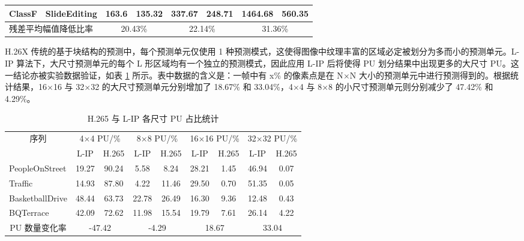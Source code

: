 \begin{table}[hbt]
\begin{tabular}{@{}clcccccc@{}}
        ClassF                                   & SlideEditing                              & 163.6                             & 135.32                            & 337.67                              & 248.71 & 1464.68 & 560.35 \\ \midrule
        \multicolumn{2}{l}{残差平均幅值降低比率} & \multicolumn{2}{c}{20.43\%}               & \multicolumn{2}{c}{22.14\%}       & \multicolumn{2}{c}{31.36\%}                                                                         \\ \bottomrule
    \end{tabular}
\end{table}

H.26X 传统的基于块结构的预测中，每个预测单元仅使用 1 种预测模式，这使得图像中纹理丰富的区域必定被划分为多而小的预测单元。L-IP 算法下，大尺寸预测单元的每个 L 形区域均有一个独立的预测模式，因此应用 L-IP 后将使得 PU 划分结果中出现更多的大尺寸 PU。这一结论亦被实验数据验证，如表 \ref{tab:L-IPPUSize} 所示。表中数据的含义是：一帧中有 x\% 的像素点是在 N$\times$N 大小的预测单元中进行预测得到的。根据统计结果，16$\times$16 与 32$\times$32 的大尺寸预测单元分别增加了 18.67\% 和 33.04\%，4$\times$4 与 8$\times$8 的小尺寸预测单元则分别减少了 47.42\% 和 4.29\%。
\begin{table}[hbt]
    \centering
    \caption{H.265 与 L-IP 各尺寸 PU 占比统计}
    \label{tab:L-IPPUSize}
    \begin{tabular}{@{}lcccccccc@{}}
        \toprule
        \multicolumn{1}{c}{\multirow{2}{*}{序列}} &
        \multicolumn{2}{c}{4$\times$4 PU/\%}      &
        \multicolumn{2}{c}{8$\times$8 PU/\%}      &
        \multicolumn{2}{c}{16$\times$16 PU/\%}    &
        \multicolumn{2}{c}{32$\times$32 PU/\%}                                                                    \\ \cmidrule(l){2-9}
        \multicolumn{1}{c}{}                      & L-IP  & H.265 & L-IP  & H.265 & L-IP  & H.265 & L-IP  & H.265 \\ \midrule
        PeopleOnStreet                            & 19.27 & 90.24 & 5.58  & 8.24  & 28.21 & 1.45  & 46.94 & 0.07  \\
        Traffic                                   & 14.93 & 87.80 & 4.22  & 11.46 & 29.50 & 0.70  & 51.35 & 0.05  \\
        BasketballDrive                           & 48.44 & 63.73 & 22.78 & 26.49 & 16.30 & 9.36  & 12.48 & 0.43  \\
        BQTerrace                                 & 42.09 & 72.62 & 11.98 & 15.54 & 19.79 & 7.61  & 26.14 & 4.22  \\ \midrule
        \multicolumn{1}{c}{PU 数量变化率}         &
        \multicolumn{2}{c}{-47.42}                &
        \multicolumn{2}{c}{-4.29}                 &
        \multicolumn{2}{c}{18.67}                 &
        \multicolumn{2}{c}{33.04}                                                                                 \\ \bottomrule
    \end{tabular}
\end{table}

